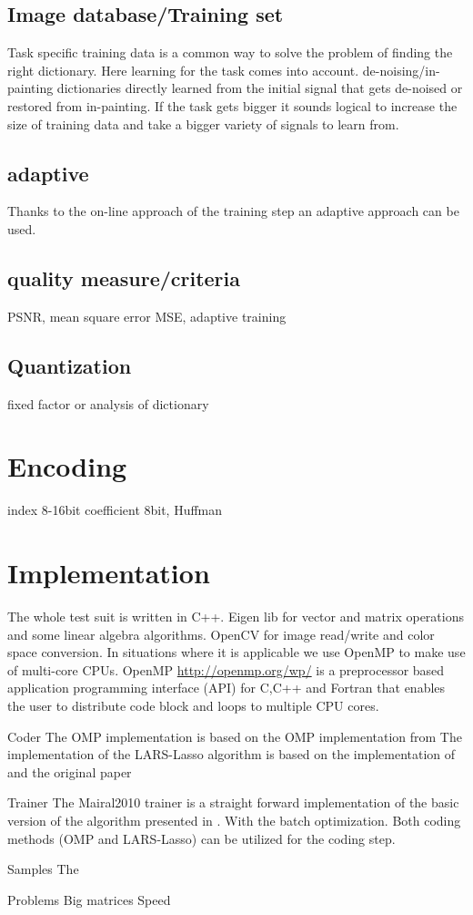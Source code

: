 \subsection{Image database/Training set}
Task specific training data is a common way to solve the problem of finding the right dictionary. 
Here learning for the task comes into account. de-noising/in-painting dictionaries directly learned from the initial
signal that gets de-noised or restored from in-painting.
If the task gets bigger it sounds logical to increase the size of training data and take a bigger variety of signals to learn from.

\subsection{adaptive}
Thanks to the on-line approach of the training step an adaptive approach can be used. 

\subsection{quality measure/criteria}
PSNR, mean square error MSE, adaptive training 


\subsection{Quantization}
fixed factor or analysis of dictionary

\section{Encoding}
index 8-16bit 
coefficient 8bit, Huffman



\section{Implementation}

The whole test suit is written in C++.
Eigen lib for vector and matrix operations and some linear algebra algorithms.
OpenCV for image read/write and color space conversion.
In situations where it is applicable we use OpenMP to make use of multi-core CPUs. OpenMP \url{http://openmp.org/wp/}
is a preprocessor based application programming interface (API) for C,C++ and Fortran that enables 
the user to distribute code block and loops to multiple CPU cores. 

Coder
The OMP implementation is based on the OMP implementation from \cite{OMPBox}
The implementation of the LARS-Lasso algorithm is based on the implementation of \cite{lars.m} and the original paper \cite{LARS}

Trainer
The Mairal2010 trainer is a straight forward implementation of the basic version of the algorithm presented in \cite{Mairal2010}.
With the batch optimization. Both coding methods (OMP and LARS-Lasso) can be utilized for the coding step.

Samples 
The 

Problems
Big matrices
Speed 

